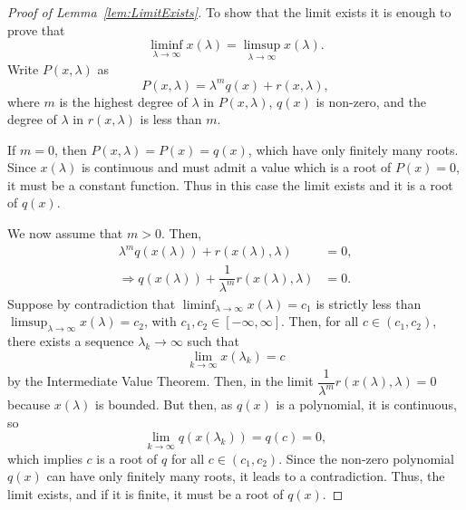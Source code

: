 \documentclass[10pt,a4paper]{amsart}
\begin{document}
\begin{proof}[Proof of Lemma~\ref{lem:LimitExists}]
    To show that the limit exists it is enough to prove that
    \begin{equation}
        \liminf_{\lambda\to\infty} x(\lambda) = \limsup_{\lambda\to\infty} x(\lambda).
    \end{equation}
    Write $P(x,\lambda)$ as
    \begin{equation}
        P(x,\lambda) = \lambda^m q(x) + r(x,\lambda),
    \end{equation}
    where $m$ is the highest degree of $\lambda$ in $P(x,\lambda)$, $q(x)$ is non-zero, and the degree of $\lambda$ in $r(x,\lambda)$ is less than $m$. 
    
    If $m=0$, then $P(x,\lambda)=P(x)=q(x)$, which have only finitely many roots. Since $x(\lambda)$ is continuous and must admit a value which is a root of $P(x)=0$, it must be a constant function. Thus in this case the limit exists and it is a root of $q(x)$.
    
    We now assume that $m>0$. Then, 
    \begin{align}
        \lambda^m q(x(\lambda)) + r(x(\lambda),\lambda) &= 0,\\
        \Rightarrow q(x(\lambda)) + \dfrac{1}{\lambda^m} r(x(\lambda),\lambda) &= 0.
    \end{align}
    Suppose by contradiction that 
    $\liminf_{\lambda\to\infty}x(\lambda) = c_1$ is strictly less than \\
    $\limsup_{\lambda\to\infty}x(\lambda) = c_2$, with $c_1,c_2\in[-\infty,\infty]$. Then, for all $c \in (c_1,c_2)$, there exists a sequence $\lambda_k \to \infty$ such that
    \begin{equation}
        \lim_{k\to\infty} x(\lambda_k) = c
    \end{equation}
    by the Intermediate Value Theorem. 
    Then, in the limit $\dfrac{1}{\lambda^m} r(x(\lambda),\lambda) = 0$ because $x(\lambda)$ is bounded.
    But then, as $q(x)$ is a polynomial, it is continuous, so 
    \begin{equation}
        \lim_{k\to\infty} q(x(\lambda_k)) = q(c) = 0,
    \end{equation}
    which implies $c$ is a root of $q$ for all $c\in(c_1,c_2)$. Since the non-zero polynomial $q(x)$ can have only finitely many roots, it leads to a contradiction. Thus, the limit exists, and if it is finite, it must be a root of $q(x)$.
\end{proof}
\end{document}
